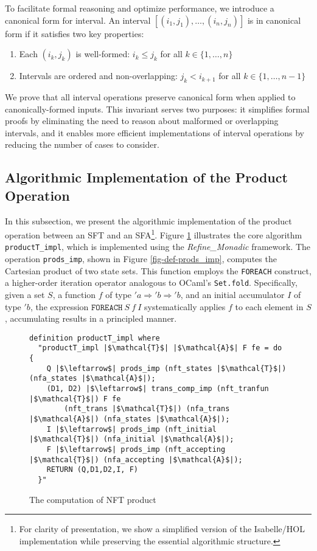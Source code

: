 \documentclass[a4paper,UKenglish,cleveref, autoref, anonymous, thm-restate]{lipics-v2021}
\begin{document}
To facilitate formal reasoning and optimize performance, we introduce a canonical form for interval. An interval $[(i_1, j_1), \ldots, (i_n, j_n)]$ is in canonical form if it satisfies two key properties:
\begin{enumerate}
  \item Each $(i_k, j_k)$ is well-formed: $i_k \leq j_k$ for all $k \in \{1,\ldots,n\}$
  \item Intervals are ordered and non-overlapping: $j_k < i_{k+1}$ for all $k \in \{1,\ldots,n-1\}$
\end{enumerate}

We prove that all interval operations preserve canonical form when applied to canonically-formed inputs. This invariant serves two purposes: it simplifies formal proofs by eliminating the need to reason about malformed or overlapping intervals, and it enables more efficient implementations of interval operations by reducing the number of cases to consider.



\subsection{Algorithmic Implementation of the Product Operation}

In this subsection, we present the algorithmic implementation of the product operation between an SFT and an SFA\footnote{For clarity of presentation, we show a simplified version of the Isabelle/HOL implementation while preserving the essential algorithmic structure.}. Figure \ref{fig-compute-nft-product} illustrates the core algorithm \texttt{productT\_impl}, which is implemented using the \emph{Refine\_Monadic} framework. The operation \texttt{prods\_imp}, shown in Figure \ref{fig-def-prods_imp}, computes the Cartesian product of two state sets. This function employs the \texttt{FOREACH} construct, a higher-order iteration operator analogous to OCaml's \texttt{Set.fold}. Specifically, given a set $S$, a function $f$ of type $'a \Rightarrow 'b \Rightarrow 'b$, and an initial accumulator $I$ of type $'b$, the expression $\texttt{FOREACH}~S~f~I$ systematically applies $f$ to each element in $S$, accumulating results in a principled manner.




\begin{figure}[hbt!]
	\begin{lstlisting}
definition productT_impl where
  "productT_impl |$\mathcal{T}$| |$\mathcal{A}$| F fe = do {
    Q |$\leftarrow$| prods_imp (nft_states |$\mathcal{T}$|) (nfa_states |$\mathcal{A}$|);
    (D1, D2) |$\leftarrow$| trans_comp_imp (nft_tranfun |$\mathcal{T}$|) F fe 
        (nft_trans |$\mathcal{T}$|) (nfa_trans |$\mathcal{A}$|) (nfa_states |$\mathcal{A}$|);
    I |$\leftarrow$| prods_imp (nft_initial |$\mathcal{T}$|) (nfa_initial |$\mathcal{A}$|);
    F |$\leftarrow$| prods_imp (nft_accepting |$\mathcal{T}$|) (nfa_accepting |$\mathcal{A}$|);
    RETURN (Q,D1,D2,I, F)
  }"
\end{lstlisting}
\caption{The computation of NFT product}
\label{fig-compute-nft-product}
\end{figure}
\end{document}
